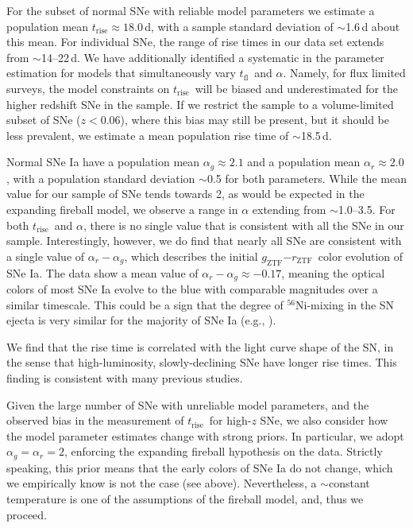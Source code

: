 \documentclass[twocolumn]{./aastex63}
\newcommand{\rztf}{$r_\mathrm{ZTF}$}
\newcommand{\gztf}{$g_\mathrm{ZTF}$}
\newcommand{\tfl}{$t_\mathrm{fl}$}
\newcommand{\trise}{$t_\mathrm{rise}$}
\begin{document}
For the subset of normal SNe with reliable model parameters we estimate a
population mean \trise$ \approx 18.0$\,d, with a sample standard deviation of
$\sim$1.6\,d about this mean. For individual SNe, the range of rise times in our
data set extends from $\sim$14--22\,d. We have additionally identified a
systematic in the parameter estimation for models that simultaneously vary \tfl\
and $\alpha$. Namely, for flux limited surveys, the model constraints on \trise\
will be biased and underestimated for the higher redshift SNe in the sample. If
we restrict the sample to a volume-limited subset of SNe ($z < 0.06$), where
this bias may still be present, but it should be less prevalent, we estimate a
mean population rise time of $\sim$18.5\,d.

Normal SNe Ia have a population mean $\alpha_g \approx 2.1$ and a population
mean $\alpha_r \approx 2.0$, with a population standard deviation $\sim$0.5 for
both parameters. While the mean value for our sample of SNe tends towards 2, as
would be expected in the expanding fireball model, we observe a range in
$\alpha$ extending from $\sim$1.0--3.5. For both \trise\ and $\alpha$, there is
no single value that is consistent with all the SNe in our sample.
Interestingly, however, we do find that nearly all SNe are consistent with a
single value of $\alpha_r - \alpha_g$, which describes the initial \gztf$ -
$\rztf\ color evolution of SNe Ia. The data show a mean value of $\alpha_r -
\alpha_g \approx -0.17$, meaning the optical colors of most SNe Ia evolve to the
blue with comparable magnitudes over a similar timescale. This could be a sign
that the degree of $^{56}$Ni-mixing in the SN ejecta is very similar for the
majority of SNe Ia (e.g., \citealt{Piro16}).

We find that the rise time is correlated with the light curve shape of the SN,
in the sense that high-luminosity, slowly-declining SNe have longer rise
times. This finding is consistent with many previous studies.

Given the large number of SNe with unreliable model parameters, and the
observed bias in the measurement of \trise\ for high-$z$ SNe, we also consider
how the model parameter estimates change with strong priors. In particular, we
adopt $\alpha_g = \alpha_r = 2$, enforcing the expanding fireball hypothesis
on the data. Strictly speaking, this prior means that the early colors of SNe
Ia do not change, which we empirically know is not the case (see above).
Nevertheless, a $\sim$constant temperature is one of the assumptions of the
fireball model, and, thus we proceed.
\end{document}

